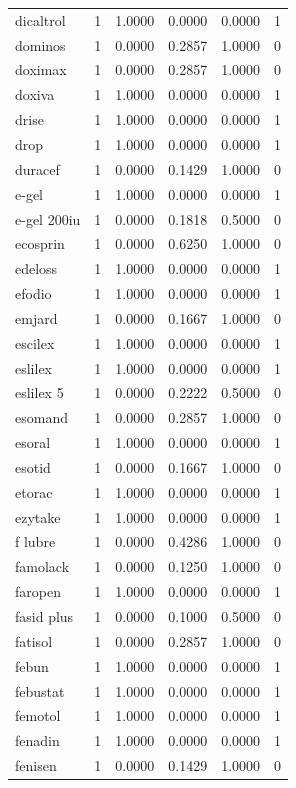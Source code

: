 \begin{longtable}{p{3.0cm}rrrrr}
dicaltrol & 1 & 1.0000 & 0.0000 & 0.0000 & 1 \\
dominos & 1 & 0.0000 & 0.2857 & 1.0000 & 0 \\
doximax & 1 & 0.0000 & 0.2857 & 1.0000 & 0 \\
doxiva & 1 & 1.0000 & 0.0000 & 0.0000 & 1 \\
drise & 1 & 1.0000 & 0.0000 & 0.0000 & 1 \\
drop & 1 & 1.0000 & 0.0000 & 0.0000 & 1 \\
duracef & 1 & 0.0000 & 0.1429 & 1.0000 & 0 \\
e-gel & 1 & 1.0000 & 0.0000 & 0.0000 & 1 \\
e-gel 200iu & 1 & 0.0000 & 0.1818 & 0.5000 & 0 \\
ecosprin & 1 & 0.0000 & 0.6250 & 1.0000 & 0 \\
edeloss & 1 & 1.0000 & 0.0000 & 0.0000 & 1 \\
efodio & 1 & 1.0000 & 0.0000 & 0.0000 & 1 \\
emjard & 1 & 0.0000 & 0.1667 & 1.0000 & 0 \\
escilex & 1 & 1.0000 & 0.0000 & 0.0000 & 1 \\
eslilex & 1 & 1.0000 & 0.0000 & 0.0000 & 1 \\
eslilex 5 & 1 & 0.0000 & 0.2222 & 0.5000 & 0 \\
esomand & 1 & 0.0000 & 0.2857 & 1.0000 & 0 \\
esoral & 1 & 1.0000 & 0.0000 & 0.0000 & 1 \\
esotid & 1 & 0.0000 & 0.1667 & 1.0000 & 0 \\
etorac & 1 & 1.0000 & 0.0000 & 0.0000 & 1 \\
ezytake & 1 & 1.0000 & 0.0000 & 0.0000 & 1 \\
f lubre & 1 & 0.0000 & 0.4286 & 1.0000 & 0 \\
famolack & 1 & 0.0000 & 0.1250 & 1.0000 & 0 \\
faropen & 1 & 1.0000 & 0.0000 & 0.0000 & 1 \\
fasid plus & 1 & 0.0000 & 0.1000 & 0.5000 & 0 \\
fatisol & 1 & 0.0000 & 0.2857 & 1.0000 & 0 \\
febun & 1 & 1.0000 & 0.0000 & 0.0000 & 1 \\
febustat & 1 & 1.0000 & 0.0000 & 0.0000 & 1 \\
femotol & 1 & 1.0000 & 0.0000 & 0.0000 & 1 \\
fenadin & 1 & 1.0000 & 0.0000 & 0.0000 & 1 \\
fenisen & 1 & 0.0000 & 0.1429 & 1.0000 & 0 \\

\end{longtable}
